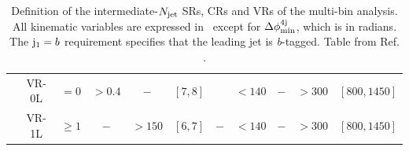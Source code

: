 \begin{landscape}
\begin{table}[htbp]
\begin{tabular}{c c c c c c c c c c c}
			& VR-0L 	& $= 0$  		& $>0.4$ 		& $-$ 		& $[7,8]$		& \cmark		& $<140$ 				& $-$ 		& $> 300 $ 				& $[800,1450]$ \\
			& VR-1L 	& $\ge 1$  	& $-$ 		& $> 150$ 	& $[6,7]$		& $-$		& $<140$				& $-$ 		& $> 300 $  				& $[800,1450]$ \\
      			\bottomrule
    		\end{tabular}
    \caption{Definition of the intermediate-$N_{\mathrm{jet}}$ SRs, CRs and VRs of the multi-bin analysis. All kinematic variables are
                          expressed in \gev\ except for $\Delta\phi_{\rm{min}}^{4{\rm{j}}}$, which is in radians. The $\mathrm{j}_1 = b$  requirement specifies that 
                          the leading jet is \textit{b}-tagged.  Table from Ref. \cite{Aaboud:2017hrg}.}
 	\end{table}
\end{landscape}


